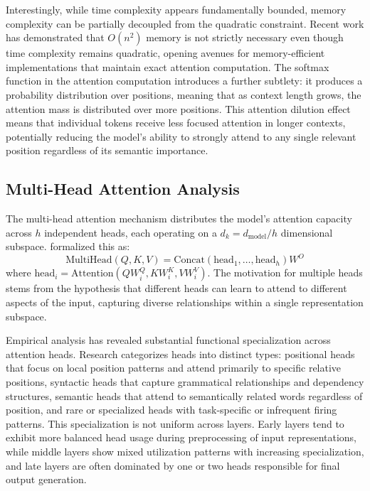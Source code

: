 \documentclass[11pt,letterpaper]{article}
\begin{document}
Interestingly, while time complexity appears fundamentally bounded, memory complexity can be partially decoupled from the quadratic constraint. Recent work has demonstrated that $O(n^2)$ memory is not strictly necessary even though time complexity remains quadratic, opening avenues for memory-efficient implementations that maintain exact attention computation. The softmax function in the attention computation introduces a further subtlety: it produces a probability distribution over positions, meaning that as context length grows, the attention mass is distributed over more positions. This attention dilution effect means that individual tokens receive less focused attention in longer contexts, potentially reducing the model's ability to strongly attend to any single relevant position regardless of its semantic importance.

\subsection{Multi-Head Attention Analysis}

The multi-head attention mechanism distributes the model's attention capacity across $h$ independent heads, each operating on a $d_k = d_{\text{model}}/h$ dimensional subspace. \cite{vaswani2017attention} formalized this as:
\begin{equation}
\text{MultiHead}(Q, K, V) = \text{Concat}(\text{head}_1, \ldots, \text{head}_h)W^O
\end{equation}
where $\text{head}_i = \text{Attention}(QW_i^Q, KW_i^K, VW_i^V)$. The motivation for multiple heads stems from the hypothesis that different heads can learn to attend to different aspects of the input, capturing diverse relationships within a single representation subspace.

Empirical analysis has revealed substantial functional specialization across attention heads. Research categorizes heads into distinct types: positional heads that focus on local position patterns and attend primarily to specific relative positions, syntactic heads that capture grammatical relationships and dependency structures, semantic heads that attend to semantically related words regardless of position, and rare or specialized heads with task-specific or infrequent firing patterns. This specialization is not uniform across layers. Early layers tend to exhibit more balanced head usage during preprocessing of input representations, while middle layers show mixed utilization patterns with increasing specialization, and late layers are often dominated by one or two heads responsible for final output generation.
\end{document}
